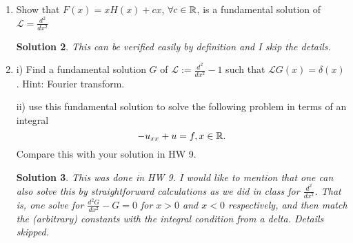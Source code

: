 \documentclass[6pt]{article}
\newtheorem{solution}{Solution}
\numberwithin{equation}{section}
\def\mathbb{\Bbb}
\begin{document}
\begin{enumerate}
\begin{solution}
Remark:  One was able to show this by straightforward calculation as in class or by using Fourier transform as in HW 10.  An analog is the following simple fact that, if $G(x)$ is a fundamental solution of $\mathcal L$, so is $G(x)+V(x)$ for any $V(x)$ such that $\mathcal LV(x)=0$.
\end{solution}

\item Show that $F(x)=xH(x)+cx$, $\forall c\in\mathbb R$, is a fundamental solution of $\mathcal L=\frac{d^2}{dx^2}$
\begin{solution}
This can be verified easily by definition and I skip the details.  
\end{solution}

\item
i)  Find a fundamental solution $G$ of $\mathcal L:=\frac{d^2}{dx^2}-1$ such that $\mathcal LG(x)=\delta(x)$.  Hint: Fourier transform.

ii) use this fundamental solution to solve the following problem in terms of an integral
\[-u_{xx}+u=f,x\in \mathbb R.\]
Compare this with your solution in HW 9.
\begin{solution}
This was done in HW 9.  I would like to mention that one can also solve this by straightforward calculations as we did in class for $\frac{d^2}{dx^2}$.  That is, one solve for $\frac{d^2G}{dx^2}-G=0$ for $x>0$ and $x<0$ respectively, and then match the (arbitrary) constants with the integral condition from a delta.  Details skipped.  
\end{solution}


\end{enumerate}
\end{document}
